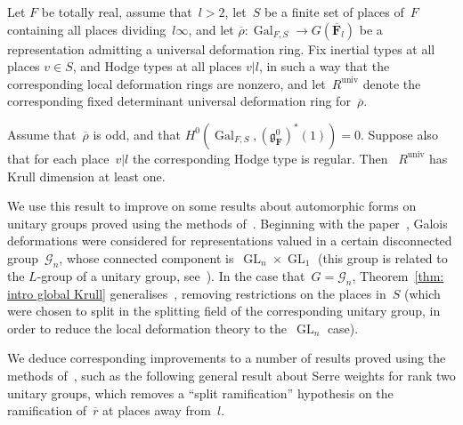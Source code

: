 \documentclass{amsart}
\renewcommand{\mathbb}{\mathbf}
\renewcommand{\ell}{l}
\def\fg{\mathfrak{g}}
\newcommand{\univ}{{\operatorname{univ}}}
\theoremstyle{definition}
\theoremstyle{remark}
\newcommand{\mar}[1]{}
\newcommand{\mar}[1]{\marginpar{\raggedright\tiny squirrel #1}}
\newcommand{\F}{\FF}
\newcommand{\FF}{{\mathbb F}}
\newcommand{\cG}{{\mathcal G}}
\newcommand{\Fbar}{\overline{\F}}
\newcommand{\Flbar}{\Fbar_{\ell}}
\DeclareMathOperator{\Gal}{Gal}
\DeclareMathOperator{\GL}{GL}
\newcommand{\rhobar}{\overline{\rho}}
\newcommand{\rbar}{\overline{r}}
\begin{document}
\begin{ithm} \label{thm: intro global Krull}
Let $F$ be totally real, assume that~$l>2$, let~$S$ be a finite set of
places of~$F$  containing all places dividing~$l\infty$, and let
$\rhobar:\Gal_{F,S}\to G(\Flbar)$ be a representation admitting a
universal deformation ring. Fix inertial types at all places $v\in S$,
and Hodge types at all places $v|l$, in such a way that the
corresponding local deformation rings are nonzero, and let~$R^\univ$ denote the
corresponding fixed determinant universal deformation ring for~$\rhobar$.

Assume that~$\rhobar$ is odd, and that
$H^0(\Gal_{F,S},(\fg_\F^0)^*(1))=0$.  Suppose also that for each
place~$v|l$ the corresponding Hodge type is regular.  Then
~$R^\univ$ %
has Krull dimension at least one.
\end{ithm}

We use this result to improve on some results about automorphic forms
on unitary groups proved using the methods of~\cite{BLGGT}. 
  Beginning with
the paper~\cite{CHT}, Galois deformations were considered for
representations valued in a certain disconnected group~$\cG_n$, whose
connected component is~$\GL_n\times\GL_1$ (this group is related to
the $L$-group of a unitary group, see~\cite[\S8]{MR3444225}).
In the case that~$G=\cG_n$, Theorem~\ref{thm: intro global Krull} generalises~\cite[Prop.\
1.5.1]{BLGGT}, removing restrictions on the places in~$S$ (which were
chosen to split in the splitting field of the corresponding unitary
group, in order to reduce the local deformation theory to the~$\GL_n$
case).

 We deduce
corresponding improvements to a number of results proved using the
methods of~\cite{BLGGT}, such as %
%
%
the following general result about Serre weights for
rank two unitary groups, which removes a ``split ramification''
hypothesis on the ramification of~$\rbar$ at places away from~$l$.
\end{document}
